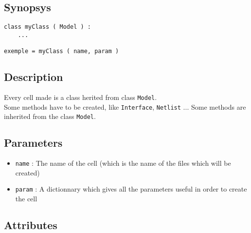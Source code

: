 \subsection{Synopsys}

\begin{verbatim}
class myClass ( Model ) :
    ...
    
exemple = myClass ( name, param )
\end{verbatim}

\subsection{Description}

Every cell made is a class herited from class \verb-Model-.\\
\indent Some methods have to be created, like \verb-Interface-, \verb-Netlist- ... Some methods are inherited from the class \verb-Model-.

\subsection{Parameters}

\begin{itemize}
    \item \verb-name- : The name of the cell (which is the name of the files which will be created)
    \item \verb-param- : A dictionnary which gives all the parameters useful in order to create the cell
\end{itemize}

\subsection{Attributes}

